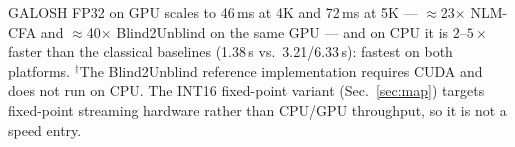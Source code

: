 \begin{table}[t]
\centering
\caption{\textbf{Controlled-resolution speed reference} at 1080p
(1920$\times$1080 Bayer) on CPU (one core) and GPU (NVIDIA RTX 4070\,Ti); the
\emph{primary} speed comparison is the full-size per-image CPU/GPU columns of
Tables~\ref{tab:sidd_medium}--\ref{tab:rawnind}. Wall-clock, warm; GALOSH GPU
is the kernel pipeline (one-time context+build $\sim$90\,ms amortised), the
others end-to-end.}
\label{tab:speed}
\setlength{\tabcolsep}{8pt}

\vspace{2pt}
{\footnotesize GALOSH FP32 on GPU scales to 46\,ms at 4K and 72\,ms at 5K ---
$\approx$23$\times$ NLM-CFA and $\approx$40$\times$ Blind2Unblind on the same
GPU --- and on CPU it is $2$--$5\times$ faster than the classical baselines
(1.38\,s vs.\ 3.21/6.33\,s): fastest on both platforms.
$^{\dagger}$The Blind2Unblind reference implementation requires CUDA and does
not run on CPU. The INT16 fixed-point variant (Sec.~\ref{sec:map})
targets fixed-point streaming hardware rather than CPU/GPU throughput, so it
is not a speed entry.}
\end{table}
